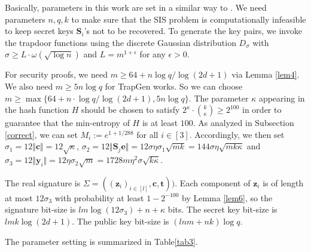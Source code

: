 \documentclass[runningheads]{llncs}
\begin{document}
Basically, parameters in this work are set in a similar way to \cite{ZJZ+18}. We need parameters $n, q, k$ to make sure that the \textsf{SIS} problem is computationally infeasible to keep secret keys $\mathbf{S}_i$'s not to be recovered. To generate the key pairs, we invoke the trapdoor functions using the discrete Gaussian distribution $D_{\sigma}$ with $\sigma\geq L \cdot \omega(\sqrt{\log n})$ and $L=m^{1+\epsilon}$ for any $\epsilon >0$. 

For security proofs, we need $m\geq 64+n \log q/\log (2d+1)$ via Lemma \ref{lem4}. We also need $m\geq 5n \log q$ for \textsf{TrapGen} works. So we can choose $m \geq \max\{64+n\cdot \log q/\log (2d+1), 5n\log q\}$.  The parameter $\kappa$ appearing in the hash function $H$ should be chosen to satisfy $2^{\kappa}\cdot {{k}\choose{\kappa}}  \geq 2^{100} $ in order to guarantee that the min-entropy of $H$ is at least $100$. As analyzed in Subsection \ref{correct}, we can set $M_i:=e^{1+1/288}$ for all $i \in [3]$. Accordingly, we then set $\sigma_1= 12\Vert \mathbf{c}\Vert=12\sqrt{\kappa}$, $\sigma_2= 12\Vert \mathbf{S}_j \mathbf{e}\Vert=12\sigma\eta\sigma_1\sqrt{mk}=144\sigma\eta\sqrt{mk\kappa}$ 
and $\sigma_3= 12\Vert \mathbf{y}_i\Vert=12\eta\sigma_2\sqrt{m}=1728m\eta^2\sigma\sqrt{k\kappa}$.

The real signature  is $\Sigma=((\mathbf{z}_i)_{i \in [l]}, \mathbf{c}, \mathbf{t}))$. Each component of $\mathbf{z}_i$ is of length at most $12\sigma_3$ with probability at least $1-2^{-100}$ by Lemma \ref{lem6}, so the signature bit-size is $lm\log (12\sigma_3)+n+\kappa$ bits. The secret key bit-size is $lmk\log(2d+1)$. The public key bit-size is $(lnm+nk)\log q$. 

The parameter setting is summarized in Table\ref{tab3}.
\end{document}
